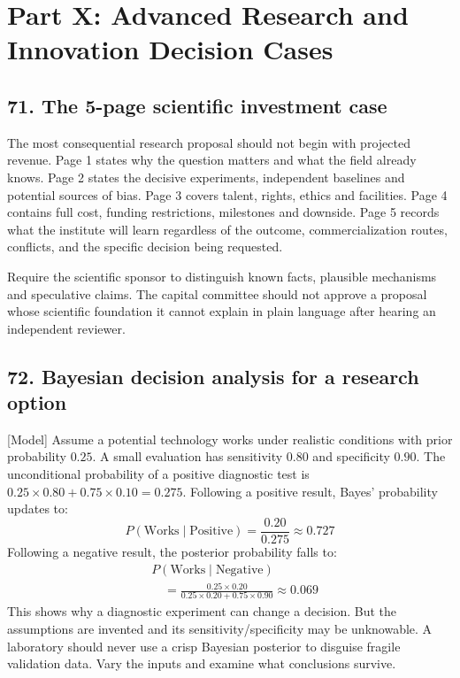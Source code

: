 \section{Part X: Advanced Research and Innovation Decision Cases}

\subsection{71. The 5-page scientific investment case}

The most consequential research proposal should not begin with projected revenue. Page 1 states why the question matters and what the field already knows. Page 2 states the decisive experiments, independent baselines and potential sources of bias. Page 3 covers talent, rights, ethics and facilities. Page 4 contains full cost, funding restrictions, milestones and downside. Page 5 records what the institute will learn regardless of the outcome, commercialization routes, conflicts, and the specific decision being requested.

Require the scientific sponsor to distinguish known facts, plausible mechanisms and speculative claims. The capital committee should not approve a proposal whose scientific foundation it cannot explain in plain language after hearing an independent reviewer.

\subsection{72. Bayesian decision analysis for a research option}

[Model] Assume a potential technology works under realistic conditions with prior probability $0.25$. A small evaluation has sensitivity $0.80$ and specificity $0.90$. The unconditional probability of a positive diagnostic test is $0.25 \times 0.80 + 0.75 \times 0.10 = 0.275$. Following a positive result, Bayes' probability updates to:
\begin{equation}
P(\text{Works} \mid \text{Positive}) = \frac{0.20}{0.275} \approx 0.727
\end{equation}
Following a negative result, the posterior probability falls to:
\begin{equation}
\begin{aligned}
&P(\text{Works} \mid \text{Negative}) \\
&\quad = \frac{0.25 \times 0.20}{0.25 \times 0.20 + 0.75 \times 0.90} \approx 0.069
\end{aligned}
\end{equation}
This shows why a diagnostic experiment can change a decision. But the assumptions are invented and its sensitivity/specificity may be unknowable. A laboratory should never use a crisp Bayesian posterior to disguise fragile validation data. Vary the inputs and examine what conclusions survive.


